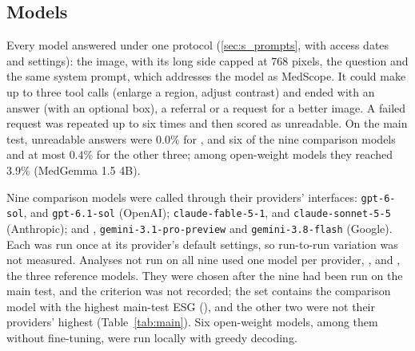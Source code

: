 \subsection{Models}
\label{subsec:models}

Every model answered under one protocol (\ref{sec:s_prompts}, with access dates and settings): the image, with its long side capped at 768 pixels, the question and the same system prompt, which addresses the model as MedScope. It could make up to three tool calls (enlarge a region, adjust contrast) and ended with an answer (with an optional box), a referral or a request for a better image. A failed request was repeated up to six times and then scored as unreadable. On the main test, unreadable answers were $0.0\%$ for \ms, \msn{} and six of the nine comparison models and at most $0.4\%$ for the other three; among open-weight models they reached $3.9\%$ (MedGemma 1.5 4B).

{\sloppy Nine comparison models were called through their providers' interfaces: \texttt{gpt-6-sol}, \gpt{} and \texttt{gpt-6.1-sol} (OpenAI); \texttt{claude-fable-5-1}, \opus{} and \texttt{claude-sonnet-5-5} (Anthropic); and \gem, \texttt{gemini-3.1-pro-preview} and \texttt{gemini-3.8-flash} (Google). Each was run once at its provider's default settings, so run-to-run variation was not measured. Analyses not run on all nine used one model per provider, \gem, \opus{} and \gpt, the three reference models. They were chosen after the nine had been run on the main test, and the criterion was not recorded; the set contains the comparison model with the highest main-test ESG (\gem), and the other two were not their providers' highest (Table~\ref{tab:main}). Six open-weight models, among them \base{} without fine-tuning, were run locally with greedy decoding.\par}

